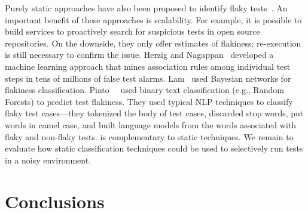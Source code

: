 \documentclass[conference]{IEEEtran}
\begin{document}
Purely static approaches have also been proposed to identify flaky tests~\cite{Herzig:2015,king2018,bertolino2020flaky,pinto-etal-msr2020}. An important benefit of these approaches is scalability. For example, it is possible to build services to proactively search for suspicious tests in open source repositories. On the downside, they only offer estimates of flakiness; re-execution is still necessary to confirm the issue. Herzig and Nagappan~\cite{Herzig:2015} developed a machine learning approach that mines association rules among individual test steps in tens of millions of false test alarms. Lam~\etal{}\cite{king2018} used Bayesian networks for flakiness classification. Pinto~\etal{}~\cite{pinto-etal-msr2020} used binary text classification (e.g.{}, Random Forests) to predict test flakiness. They used typical NLP techniques to classify flaky test cases---they tokenized the body of test cases, discarded stop words, put words in camel case, and built language models from the words associated with flaky and non-flaky tests. \tname{} is complementary to static techniques. We remain to evaluate how static classification techniques could be used to selectively run tests in a noisy environment.




\section{Conclusions}
\label{sec:conclusion}
\end{document}
